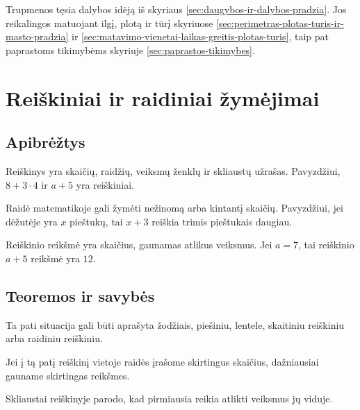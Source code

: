 Trupmenos tęsia dalybos idėją iš skyriaus \ref{sec:daugybos-ir-dalybos-pradzia}. Jos reikalingos matuojant ilgį, plotą ir tūrį skyriuose \ref{sec:perimetras-plotas-turis-ir-masto-pradzia} ir \ref{sec:matavimo-vienetai-laikas-greitis-plotas-turis}, taip pat paprastoms tikimybėms skyriuje \ref{sec:paprastos-tikimybes}.

\section{Reiškiniai ir raidiniai žymėjimai}\label{sec:reiskiniai-ir-raidiniai-zymejimai}

\subsection{Apibrėžtys}

\begin{apibreztis}
Reiškinys yra skaičių, raidžių, veiksmų ženklų ir skliaustų užrašas. Pavyzdžiui, \(8+3\cdot4\) ir \(a+5\) yra reiškiniai.
\end{apibreztis}

\begin{apibreztis}
Raidė matematikoje gali žymėti nežinomą arba kintantį skaičių. Pavyzdžiui, jei dėžutėje yra \(x\) pieštukų, tai \(x+3\) reiškia trimis pieštukais daugiau.
\end{apibreztis}

\begin{apibreztis}
Reiškinio reikšmė yra skaičius, gaunamas atlikus veiksmus. Jei \(a=7\), tai reiškinio \(a+5\) reikšmė yra \(12\).
\end{apibreztis}

\subsection{Teoremos ir savybės}

\begin{savybe}
Ta pati situacija gali būti aprašyta žodžiais, piešiniu, lentele, skaitiniu reiškiniu arba raidiniu reiškiniu.
\end{savybe}

\begin{savybe}
Jei į tą patį reiškinį vietoje raidės įrašome skirtingus skaičius, dažniausiai gauname skirtingas reikšmes.
\end{savybe}

\begin{savybe}
Skliaustai reiškinyje parodo, kad pirmiausia reikia atlikti veiksmus jų viduje.
\end{savybe}

